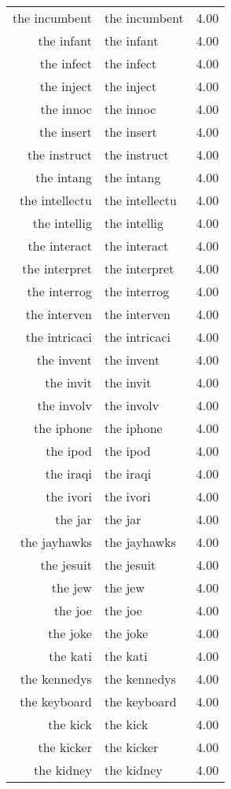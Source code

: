\begin{table}[ht]
\begin{tabular}{rlr}
  the incumbent & the incumbent & 4.00 \\ 
  the infant & the infant & 4.00 \\ 
  the infect & the infect & 4.00 \\ 
  the inject & the inject & 4.00 \\ 
  the innoc & the innoc & 4.00 \\ 
  the insert & the insert & 4.00 \\ 
  the instruct & the instruct & 4.00 \\ 
  the intang & the intang & 4.00 \\ 
  the intellectu & the intellectu & 4.00 \\ 
  the intellig & the intellig & 4.00 \\ 
  the interact & the interact & 4.00 \\ 
  the interpret & the interpret & 4.00 \\ 
  the interrog & the interrog & 4.00 \\ 
  the interven & the interven & 4.00 \\ 
  the intricaci & the intricaci & 4.00 \\ 
  the invent & the invent & 4.00 \\ 
  the invit & the invit & 4.00 \\ 
  the involv & the involv & 4.00 \\ 
  the iphone & the iphone & 4.00 \\ 
  the ipod & the ipod & 4.00 \\ 
  the iraqi & the iraqi & 4.00 \\ 
  the ivori & the ivori & 4.00 \\ 
  the jar & the jar & 4.00 \\ 
  the jayhawks & the jayhawks & 4.00 \\ 
  the jesuit & the jesuit & 4.00 \\ 
  the jew & the jew & 4.00 \\ 
  the joe & the joe & 4.00 \\ 
  the joke & the joke & 4.00 \\ 
  the kati & the kati & 4.00 \\ 
  the kennedys & the kennedys & 4.00 \\ 
  the keyboard & the keyboard & 4.00 \\ 
  the kick & the kick & 4.00 \\ 
  the kicker & the kicker & 4.00 \\ 
  the kidney & the kidney & 4.00 \\ 

\end{tabular}
\end{table}
